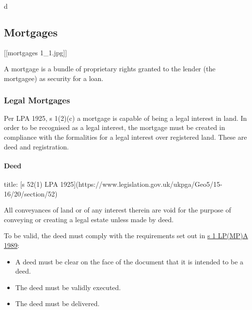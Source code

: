 \documentclass[
]{article}
\newenvironment{Shaded}{}{}
\newcommand{\NormalTok}[1]{#1}
\providecommand{\tightlist}{%
  \setlength{\itemsep}{0pt}\setlength{\parskip}{0pt}}
\begin{document}
d

\hypertarget{mortgages}{%
\subsection{Mortgages}\label{mortgages}}

{[}{[}mortgages 1\_1.jpg{]}{]}

\begin{Shaded}
\begin{Highlighting}[]
\NormalTok{A mortgage is a bundle of proprietary rights granted to the lender (the mortgagee) as security for a loan.}
\end{Highlighting}
\end{Shaded}

\hypertarget{legal-mortgages}{%
\subsubsection{Legal Mortgages}\label{legal-mortgages}}

Per LPA 1925, s 1(2)(c) a mortgage is capable of being a legal interest
in land. In order to be recognised as a legal interest, the mortgage
must be created in compliance with the formalities for a legal interest
over registered land. These are deed and registration.

\hypertarget{deed}{%
\paragraph{Deed}\label{deed}}

\begin{Shaded}
\begin{Highlighting}[]
\NormalTok{title: [s 52(1) LPA 1925](https://www.legislation.gov.uk/ukpga/Geo5/15{-}16/20/section/52)}

\NormalTok{All conveyances of land or of any interest therein are void for the purpose of conveying or creating a legal estate unless made by deed.}
\end{Highlighting}
\end{Shaded}

To be valid, the deed must comply with the requirements set out in
\href{https://www.legislation.gov.uk/ukpga/1989/34/section/1}{s 1
LP(MP)A 1989}:

\begin{itemize}
\tightlist
\item
  A deed must be clear on the face of the document that it is intended
  to be a deed.
\item
  The deed must be validly executed.
\item
  The deed must be delivered.
\end{itemize}
\end{document}
